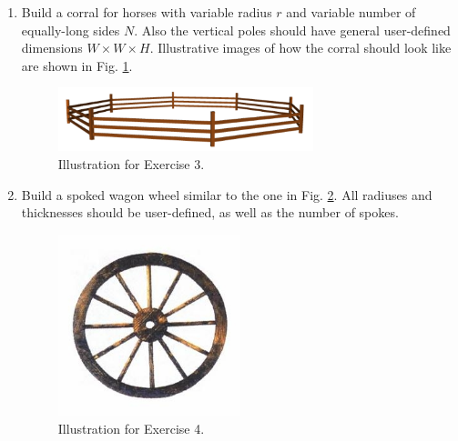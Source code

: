 \documentclass{article}
\begin{document}
\begin{enumerate}
\item Build a corral for horses with variable radius $r$ and variable number 
of equally-long sides $N$. Also the vertical poles should have general user-defined 
dimensions $W \times W \times H$. Illustrative images of how the corral should look like 
are shown in Fig. \ref{fig:corral2}.

\begin{figure}[!ht]
\begin{center}
\includegraphics[width=0.7\textwidth]{img/tam-3.png}
\end{center}
\vspace{-2mm}
\caption{Illustration for Exercise 3.}
\label{fig:corral2}
\end{figure}
\noindent

\item Build a spoked wagon wheel similar to the one in Fig. \ref{fig:wheel-1}. All radiuses 
and thicknesses should be user-defined, as well as the number of spokes.

\newpage

\begin{figure}[!ht]
\begin{center}
\includegraphics[width=0.5\textwidth]{img/wagonwheel-1.png}
\end{center}
\vspace{-8mm}
\caption{Illustration for Exercise 4.}
\label{fig:wheel-1}
\end{figure}
\noindent

\end{enumerate}
\end{document}
